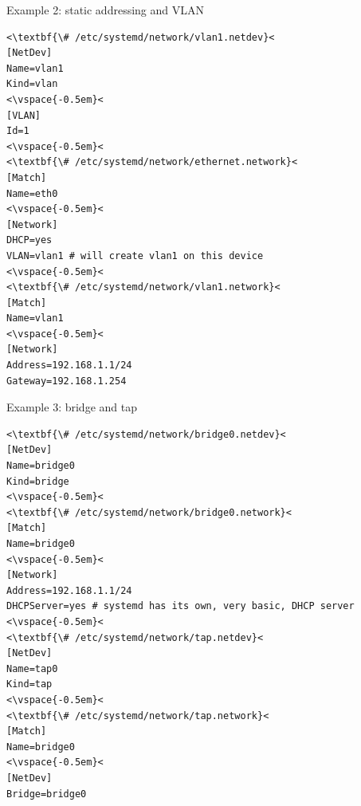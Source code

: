 \documentclass[11pt,final,usepdftitle=false]{beamer}
\begin{document}
\begin{frame}[fragile]{Example 2: static addressing and VLAN}
\begin{lstlisting}[basicstyle=\ttfamily\footnotesize,escapeinside={<<}]
<\textbf{\# /etc/systemd/network/vlan1.netdev}<
[NetDev]
Name=vlan1
Kind=vlan
<\vspace{-0.5em}<
[VLAN]
Id=1
<\vspace{-0.5em}<
<\textbf{\# /etc/systemd/network/ethernet.network}<
[Match]
Name=eth0
<\vspace{-0.5em}<
[Network]
DHCP=yes
VLAN=vlan1 # will create vlan1 on this device
<\vspace{-0.5em}<
<\textbf{\# /etc/systemd/network/vlan1.network}<
[Match]
Name=vlan1
<\vspace{-0.5em}<
[Network]
Address=192.168.1.1/24
Gateway=192.168.1.254
\end{lstlisting}
\end{frame}

\begin{frame}[fragile]{Example 3: bridge and tap}
\begin{lstlisting}[basicstyle=\ttfamily\scriptsize,escapeinside={<<}]
<\textbf{\# /etc/systemd/network/bridge0.netdev}<
[NetDev]
Name=bridge0
Kind=bridge
<\vspace{-0.5em}<
<\textbf{\# /etc/systemd/network/bridge0.network}<
[Match]
Name=bridge0
<\vspace{-0.5em}<
[Network]
Address=192.168.1.1/24
DHCPServer=yes # systemd has its own, very basic, DHCP server
<\vspace{-0.5em}<
<\textbf{\# /etc/systemd/network/tap.netdev}<
[NetDev]
Name=tap0
Kind=tap
<\vspace{-0.5em}<
<\textbf{\# /etc/systemd/network/tap.network}<
[Match]
Name=bridge0
<\vspace{-0.5em}<
[NetDev]
Bridge=bridge0
\end{lstlisting}
\end{frame}
\end{document}
